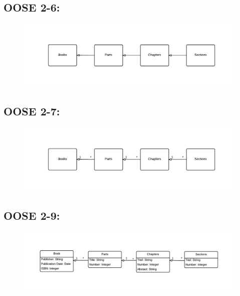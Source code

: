 \documentclass[11pt,a4paper]{article}
\begin{document}
\subsection{OOSE 2-6:}

\begin{figure}[h!]
    \centering
    \includegraphics[width=1.1\textwidth]{pictures/oose2_6}
    \label{fig:OOSE26}
\end{figure}

\subsection{OOSE 2-7:}
\begin{figure}[h!]
    \centering
    \includegraphics[width=1.1\textwidth]{pictures/oose2_7}

    \label{fig:OOSE27}
\end{figure}


\newpage
\subsection{OOSE 2-9:}

\begin{figure}[h!]
    \centering
    \includegraphics[width=1.1\textwidth]{pictures/oose2_9}

    \label{fig:OOSE29}
\end{figure}
\end{document}
